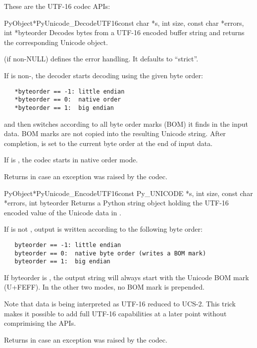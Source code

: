 \documentclass{manual}
\begin{document}

These are the UTF-16 codec APIs:

\begin{cfuncdesc}{PyObject*}{PyUnicode_DecodeUTF16}{const char *s,
                                               int size,
                                               const char *errors,
                                               int *byteorder}
Decodes  bytes from a UTF-16 encoded buffer string and
returns the corresponding Unicode object.

 (if non-NULL) defines the error handling. It defaults
to ``strict''.

If  is non-\NULL{}, the decoder starts decoding using
the given byte order:

\begin{verbatim}
   *byteorder == -1: little endian
   *byteorder == 0:  native order
   *byteorder == 1:  big endian
\end{verbatim}

and then switches according to all byte order marks (BOM) it finds in
the input data. BOM marks are not copied into the resulting Unicode
string.  After completion,  is set to the current byte
order at the end of input data.

If  is \NULL{}, the codec starts in native order mode.

Returns \NULL{} in case an exception was raised by the codec.
\end{cfuncdesc}

\begin{cfuncdesc}{PyObject*}{PyUnicode_EncodeUTF16}{const Py_UNICODE *s,
                                               int size,
                                               const char *errors,
                                               int byteorder}
Returns a Python string object holding the UTF-16 encoded value of the
Unicode data in .

If  is not , output is written according to the
following byte order:

\begin{verbatim}
   byteorder == -1: little endian
   byteorder == 0:  native byte order (writes a BOM mark)
   byteorder == 1:  big endian
\end{verbatim}

If byteorder is , the output string will always start with the
Unicode BOM mark (U+FEFF). In the other two modes, no BOM mark is
prepended.

Note that  data is being interpreted as UTF-16
reduced to UCS-2. This trick makes it possible to add full UTF-16
capabilities at a later point without comprimising the APIs.

Returns \NULL{} in case an exception was raised by the codec.
\end{cfuncdesc}
\end{document}
